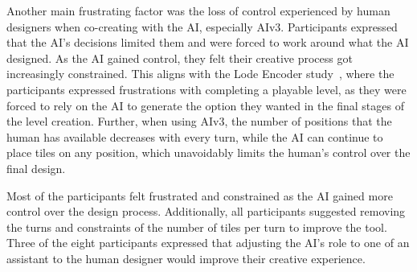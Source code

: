 Another main frustrating factor was the loss of control experienced by human designers when co-creating with the AI, especially AIv3. Participants expressed that the AI's decisions limited them and were forced to work around what the AI designed. As the AI gained control, they felt their creative process got increasingly constrained. This aligns with the Lode Encoder study~, where the participants expressed frustrations with completing a playable level, as they were forced to rely on the AI to generate the option they wanted in the final stages of the level creation. Further, when using AIv3, the number of positions that the human has available decreases with every turn, while the AI can continue to place tiles on any position, which unavoidably limits the human's control over the final design.

Most of the participants felt frustrated and constrained as the AI gained more control over the design process. Additionally, all participants suggested removing the turns and constraints of the number of tiles per turn to improve the tool. Three of the eight participants expressed that adjusting the AI's role to one of an assistant to the human designer would improve their creative experience. 





